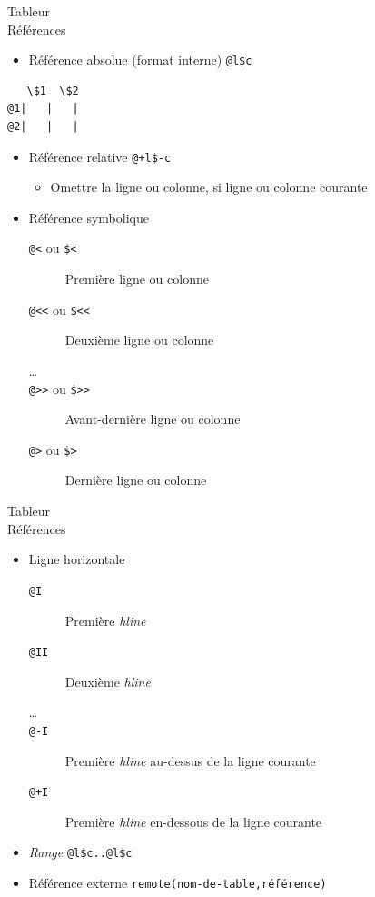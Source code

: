 \documentclass[presentation,t,hideothersubsections]{beamer}
\begin{document}
\begin{frame}[fragile,label=sec-3-3-5]{Tableur \\ Références}
 \begin{itemize}
\item Référence absolue (format interne) \texttt{@l\$c}
\end{itemize}

\begin{verbatim}
   \$1  \$2
@1|   |   |
@2|   |   |
\end{verbatim}

\begin{itemize}
\item Référence relative \texttt{@+l\$-c}
\begin{itemize}
\item Omettre la ligne ou colonne, si ligne ou colonne \alert{courante}
\end{itemize}

\item Référence symbolique
\begin{description}
\item[\texttt{@<} ou \texttt{\$<}] Première ligne ou colonne
\item[\texttt{@<<} ou \texttt{\$<<}] Deuxième ligne ou colonne
\item[\ldots{}]
\item[\texttt{@>>} ou \texttt{\$>>}] Avant-dernière ligne ou colonne
\item[\texttt{@>} ou \texttt{\$>}] Dernière ligne ou colonne
\end{description}
\end{itemize}
\end{frame}
\begin{frame}[fragile,label=sec-3-3-6]{Tableur \\ Références}
 \begin{itemize}
\item Ligne horizontale
\begin{description}
\item[\texttt{@I}] Première \emph{hline}
\item[\texttt{@II}] Deuxième \emph{hline}
\item[\ldots{}]
\item[\texttt{@-I}] Première \emph{hline} au-dessus de la ligne courante
\item[\texttt{@+I}] Première \emph{hline} en-dessous de la ligne courante
\end{description}

\item \emph{Range} \texttt{@l\$c..@l\$c}

\item Référence externe \texttt{remote(nom-de-table,référence)}
\end{itemize}
\end{frame}
\end{document}
